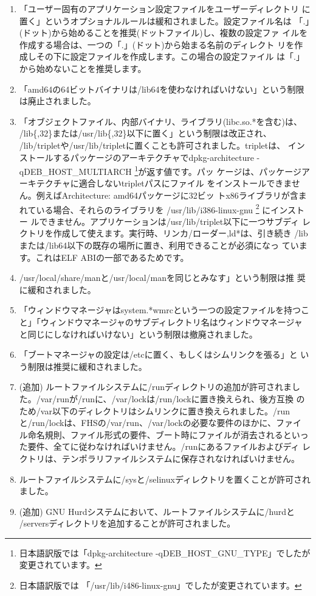 \documentclass[mingoth,a4paper]{jsarticle}
\begin{document}
\begin{enumerate}
\item 「ユーザー固有のアプリケーション設定ファイルをユーザーディレクトリ
      に置く」というオプショナルルールは緩和されました。設定ファイル名は
      「.」(ドット)から始めることを推奨(ドットファイル)し、複数の設定ファ
      イルを作成する場合は、一つの「.」(ドット)から始まる名前のディレクト
      リを作成しその下に設定ファイルを作成します。この場合の設定ファイル
      は「.」から始めないことを推奨します。
\item 「amd64の64ビットバイナリは/lib64を使わなければいけない」という制限
      は廃止されました。

\item 「オブジェクトファイル、内部バイナリ、ライブラリ(libc.so.*を含む)は、
      /lib\{,32\}または/usr/lib\{,32\}以下に置く」という制限は改正され、
      /lib/tripletや/usr/lib/tripletに置くことも許可されました。tripletは、
      インストールするパッケージのアーキテクチャでdpkg-architecture
      -qDEB\_HOST\_MULTIARCH \footnote{日本語訳版では「dpkg-architecture
      -qDEB\_HOST\_GNU\_TYPE」でしたが変更されています。}が返す値です。パッ
      ケージは、パッケージアーキテクチャに適合しないtripletパスにファイル
      をインストールできません。例えばArchitecture: amd64パッケージに32ビッ
      トx86ライブラリが含まれている場合、それらのライブラリを
      /usr/lib/i386-linux-gnu \footnote{日本語訳版では
      「/usr/lib/i486-linux-gnu」でしたが変更されています。} にインストー
      ルできません。アプリケーションは/usr/lib/triplet以下に一つサブディ
      レクトリを作成して使えます。実行時、リンカ/ローダー,ld*は、引き続き
      /libまたは/lib64以下の既存の場所に置き、利用できることが必須になっ
      ています。これはELF ABIの一部であるためです。

\item /usr/local/share/manと/usr/local/manを同じとみなす」という制限は推
      奨に緩和されました。
\item「ウィンドウマネージャはsystem.*wmrcという一つの設定ファイルを持つこ
      と」「ウィンドウマネージャのサブディレクトリ名はウィンドウマネージャ
      と同じにしなければいけない」という制限は撤廃されました。
\item 「ブートマネージャの設定は/etcに置く、もしくはシムリンクを張る」と
      いう制限は推奨に緩和されました。
\item (追加) ルートファイルシステムに/runディレクトリの追加が許可されまし
      た。/var/runが/runに、/var/lockは/run/lockに置き換えられ、後方互換
      のため/var以下のディレクトリはシムリンクに置き換えられました。/run
      と/run/lockは、FHSの/var/run、/var/lockの必要な要件のほかに、ファイ
      ル命名規則、ファイル形式の要件、ブート時にファイルが消去されるといっ
      た要件、全てに従わなければいけません。/runにあるファイルおよびディ
      レクトリは、テンポラリファイルシステムに保存されなければいけません。
\item ルートファイルシステムに/sysと/selinuxディレクトリを置くことが許可されました。
\item (追加) GNU Hurdシステムにおいて、ルートファイルシステムに/hurdと
      /serversディレクトリを追加することが許可されました。
\end{enumerate}
\end{document}
